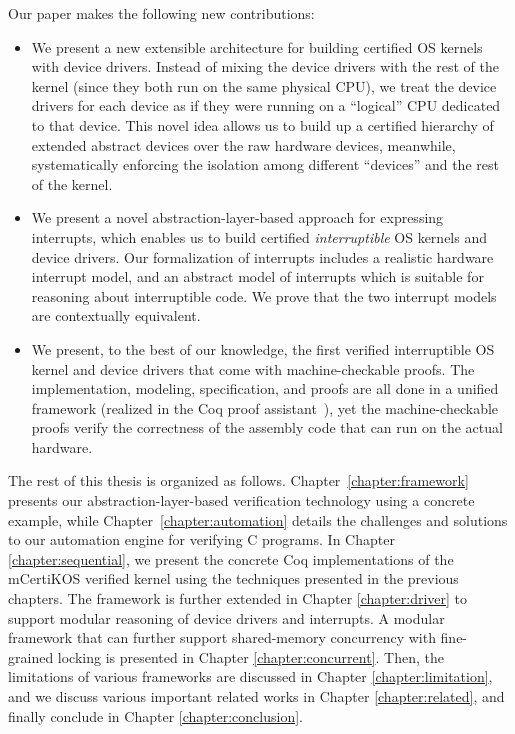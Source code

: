 Our paper makes the following new contributions:
\begin{itemize}
\item We present a new extensible architecture for building certified
  OS kernels with device drivers. Instead of mixing the device drivers
  with the rest of the kernel (since they both run on the same
  physical CPU), we treat the device drivers for each device as if
  they were running on a ``logical'' CPU dedicated to that device.
  This novel idea allows us to build up a certified hierarchy of
  extended abstract devices over the raw hardware devices, meanwhile,
  systematically enforcing the isolation among different ``devices''
  and the rest of the kernel.

\item We present a novel abstraction-layer-based approach for
  expressing interrupts, which enables us to build certified
  {\em interruptible} OS kernels and device drivers. Our formalization of
  interrupts includes a realistic hardware interrupt model, and an
  abstract model of interrupts which is suitable for reasoning about
  interruptible code. We prove that the two interrupt models are
  contextually equivalent.

\item We present, to the best of our knowledge, the first verified
  interruptible OS kernel and device drivers that come with
  machine-checkable proofs.  The implementation, modeling, specification, and
  proofs are all done in a unified framework (realized in the Coq
  proof assistant~\cite{coq}), yet the machine-checkable proofs verify the
  correctness of the assembly code that can run on the actual
  hardware.
\end{itemize}

The rest of this thesis is organized as follows.
Chapter~\ref{chapter:framework} presents our abstraction-layer-based verification
technology using a concrete example, while
Chapter~\ref{chapter:automation} details the challenges and solutions to
our automation engine for verifying C programs.
In Chapter \ref{chapter:sequential}, we present the concrete Coq
implementations of the mCertiKOS verified
kernel using the techniques presented in the previous chapters.
The framework is further extended in Chapter \ref{chapter:driver}
to support modular reasoning of device drivers and interrupts.
A modular framework that can further support shared-memory concurrency
with fine-grained locking is presented in Chapter \ref{chapter:concurrent}.
Then, the limitations of various frameworks are discussed in
Chapter \ref{chapter:limitation}, and we discuss various important
related works in Chapter \ref{chapter:related}, and finally conclude
in Chapter \ref{chapter:conclusion}.

